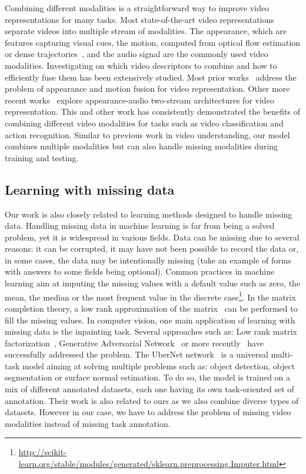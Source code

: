\documentclass[runningheads]{llncs}
\begin{document}
Combining different modalities is a straightforward way to improve video representations for many tasks. Most state-of-the-art video representations~\cite{feichtenhofer16convolutionaltwostream,feichtenhofer17spatiotemporalmultiplier,simonyan2014,miech17learnable,wang16temporal} separate videos into multiple stream of modalities. The appearance, which are features capturing visual cues, the motion, computed from optical flow estimation or dense trajectories~\cite{wang13action}, and the audio signal are the commonly used video modalities.
Investigating on which video descriptors to combine and how to efficiently fuse them
has been extensively studied.
Most prior works~\cite{carreira2017quovadis,feichtenhofer16convolutionaltwostream,girdhar17actionvlad,simonyan2014,varol17longterm} address the problem of appearance and motion fusion for video representation.
Other more recent works~\cite{arandjelovic17look,miech17learnable} explore appearance-audio two-stream architectures for video representation. This and other work has consistently demonstrated the benefits of combining different video modalities for tasks such as video classification and action recognition. Similar to previous work in video understanding, our model combines multiple modalities but can also handle missing modalities during training and testing.


\subsection{Learning with missing data}
Our work is also closely related to learning methods designed to handle missing data. Handling missing data in machine learning is far from being a solved problem, yet it is widespread in various fields. Data can be missing due to several reasons: it can be corrupted, it may have not been possible to record the data or, in some cases, the data may be intentionally missing (take an example of forms with answers to some fields being optional). Common practices in machine learning aim at imputing the missing values with a default value such as zero, the mean, the median or the most frequent value in the discrete case\footnote{\url{http://scikit-learn.org/stable/modules/generated/sklearn.preprocessing.Imputer.html}}. In the matrix completion theory, a low rank approximation of the matrix~\cite{jain2013low} can be performed to fill the missing values. In computer vision, one main application of learning with missing data is the inpainting task. Several approaches such as: Low rank matrix factorization~\cite{mairal10online}, Generative Adversarial Network~\cite{yeh17semantic} or more recently~\cite{ulyanov17deepimageprior} have successfully addressed the problem. The UberNet network~\cite{kokkinos17ubernet} is a universal multi-task model aiming at solving multiple problems such as: object detection, object segmentation or surface normal estimation. To do so, the model is trained on a mix of different annotated datasets, each one having its own task-oriented set of annotation. Their work is also related to ours as we also combine diverse types of datasets. However in our case, we have to address the problem of missing video modalities instead of missing task annotation.
\end{document}
